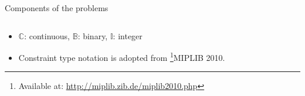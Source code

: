 \documentclass{beamer}
\newcommand{\miplib}{\textsf{MIPLIB 2010}}
\newcommand{\julia}{\texttt{Julia}}
\begin{document}
\begin{frame}{Components of the problems}
\begin{table}[H]
\begin{threeparttable}
\begin{tabular}{@{}lllll@{}}
				\end{tabular}
			\end{threeparttable}
		\end{table}
		\vspace{-0.5cm}
		\begin{itemize}
			\item $\mathbb{C}$: continuous, $\mathbb{B}$: binary, $\mathbb{I}$: integer
			\item Constraint type notation is adopted from \footnote{\tiny Available at: \href{http://miplib.zib.de/miplib2010.php}{http://miplib.zib.de/miplib2010.php}}{\miplib}.
		\end{itemize}
	\end{frame}
	
\end{document}
